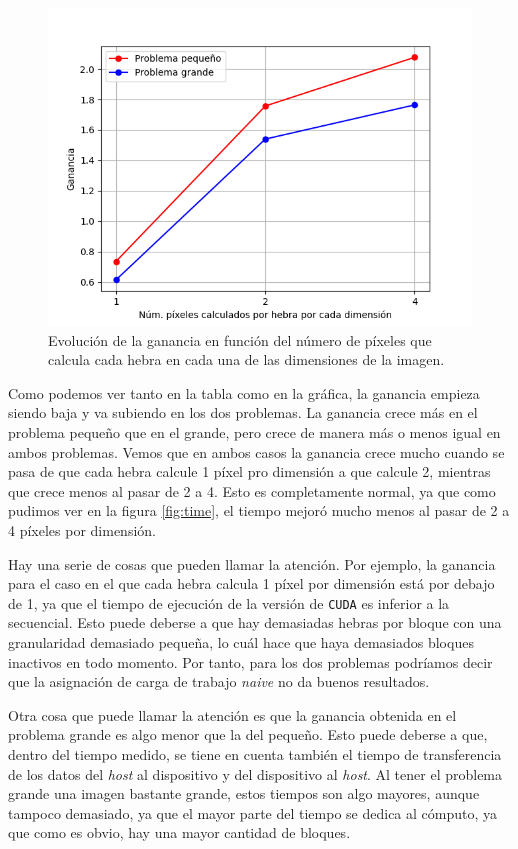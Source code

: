 \documentclass[11pt,a4paper]{article}
\begin{document}
\begin{figure}[H]
  \centering
  \includegraphics[scale=0.6]{img/speedup}
  \caption{Evolución de la ganancia en función del número de píxeles que calcula
  cada hebra en cada una de las dimensiones de la imagen.}
  \label{fig:speedup}
\end{figure}

Como podemos ver tanto en la tabla como en la gráfica, la ganancia empieza siendo baja y va
subiendo en los dos problemas. La ganancia crece más en el problema pequeño que en el grande,
pero crece de manera más o menos igual en ambos problemas. Vemos que en ambos casos la ganancia
crece mucho cuando se pasa de que cada hebra calcule 1 píxel pro dimensión a que calcule 2,
mientras que crece menos al pasar de 2 a 4. Esto es completamente normal, ya que como pudimos
ver en la figura \ref{fig:time}, el tiempo mejoró mucho menos al pasar de 2 a 4 píxeles por
dimensión.

Hay una serie de cosas que pueden llamar la atención. Por ejemplo, la ganancia para el caso
en el que cada hebra calcula 1 píxel por dimensión está por debajo de 1, ya que el tiempo de
ejecución de la versión de \texttt{CUDA} es inferior a la secuencial. Esto puede deberse
a que hay demasiadas hebras por bloque con una granularidad demasiado pequeña, lo cuál hace
que haya demasiados bloques inactivos en todo momento. Por tanto, para los dos problemas podríamos
decir que la asignación de carga de trabajo \textit{naive} no da buenos resultados.

Otra cosa que puede llamar la atención es que la ganancia obtenida en el problema grande es algo
menor que la del pequeño. Esto puede deberse a que, dentro del tiempo medido, se tiene en
cuenta también el tiempo de transferencia de los datos del \textit{host} al dispositivo
y del dispositivo al \textit{host}. Al tener el problema grande una imagen bastante grande,
estos tiempos son algo mayores, aunque tampoco demasiado, ya que el mayor parte del tiempo
se dedica al cómputo, ya que como es obvio, hay una mayor cantidad de bloques.
\end{document}
